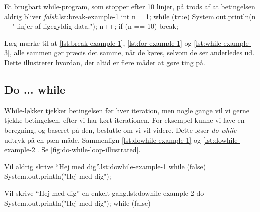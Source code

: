         \begin{JavaCode}{Et brugbart while-program, som stopper efter 10 linjer, på trods af at betingelsen aldrig bliver \emph{falsk}.}{lst:break-example-1}
			int n = 1;
			while (true) {
				System.out.println(n + " linjer af ligegyldig data.");
				n++;
				if (n == 10)  break;
			}
		\end{JavaCode}

        Læg mærke til at \autoref{lst:break-example-1},
        \autoref{lst:for-example-1} og \autoref{lst:while-example-3}, alle
        sammen gør præcis det samme, når de køres, selvom de ser
        anderledes ud. Dette illustrerer hvordan, der altid er flere
        måder at gøre ting på.


	\subsection{Do ... while}

        While-løkker tjekker betingelsen før hver iteration, men nogle
        gange vil vi gerne tjekke betingelsen, efter vi har kørt
        iterationen. For eksempel kunne vi lave en beregning, og
        baseret på den, beslutte om vi vil videre. Dette løser
        \emph{do-while} udtryk på en pæn måde. Sammenlign
        \autoref{lst:dowhile-example-1} og
        \autoref{lst:dowhile-example-2}. Se \autoref{fig:do-while-loop-illustrated}.

		\begin{JavaCode}{Vil aldrig skrive ``Hej med dig''.}{lst:dowhile-example-1}
			while (false) {
				System.out.println("Hej med dig");
			}
		\end{JavaCode}

		\begin{JavaCode}{Vil skrive ``Hej med dig'' en enkelt gang.}{lst:dowhile-example-2}
			do {
				System.out.println("Hej med dig");
			} while (false)
		\end{JavaCode}


